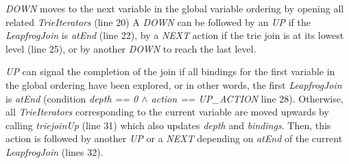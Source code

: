 \textit{DOWN} moves to the next variable in the global variable ordering by opening all related \textit{TrieIterators}
(line 20) %
A \textit{DOWN} can be followed by an \textit{UP} if the \textit{LeapfrogJoin} is \textit{atEnd} (line 22),
by a \textit{NEXT} action if the trie join is at its lowest level (line 25), or by another \textit{DOWN} to reach the last level.

\textit{UP} can signal the completion of the join if all bindings for the first variable in the global ordering have
been explored, or in other words, the first \textit{LeapfrogJoin} is \textit{atEnd} (condition
\textit{depth == 0 $\wedge$ action ==  UP\_ACTION} line 28). %
Otherwise, all \textit{TrieIterators} corresponding to the current variable are moved upwards by calling \textit{triejoinUp} (line 31)
which also updates \textit{depth} and \textit{bindings}.  %
Then, this action is followed by another \textit{UP} or a \textit{NEXT} depending on \textit{atEnd} of the current \textit{LeapfrogJoin}
(lines 32). %

